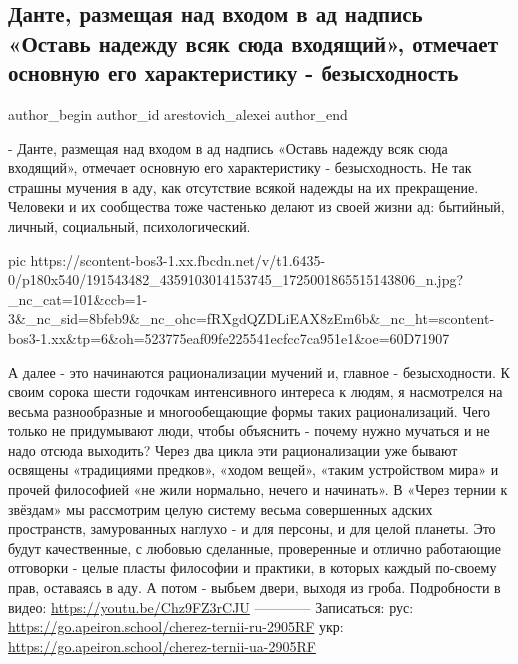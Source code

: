  
 
 
 
 
 
\subsection{Данте, размещая над входом в ад надпись «Оставь надежду всяк сюда входящий», отмечает основную его характеристику - безысходность}
\label{sec:25_05_2021.fb.arestovich_alexei.1.ad_dante}
\ifcmt
 author_begin
   author_id arestovich_alexei
 author_end
\fi

- Данте, размещая над входом в ад надпись «Оставь надежду всяк сюда входящий», отмечает основную его характеристику - безысходность.
Не так страшны мучения в аду, как отсутствие всякой надежды на их прекращение.
Человеки и их сообщества тоже частенько делают из своей жизни ад: бытийный, личный, социальный, психологический.

\ifcmt
  pic https://scontent-bos3-1.xx.fbcdn.net/v/t1.6435-0/p180x540/191543482_4359103014153745_1725001865515143806_n.jpg?_nc_cat=101&ccb=1-3&_nc_sid=8bfeb9&_nc_ohc=fRXgdQZDLiEAX8zEm6b&_nc_ht=scontent-bos3-1.xx&tp=6&oh=523775eaf09fe225541ecfcc7ca951e1&oe=60D71907
\fi

А далее - это начинаются рационализации мучений и, главное - безысходности.
К своим сорока шести годочкам интенсивного интереса к людям, я насмотрелся на весьма разнообразные и многообещающие формы таких рационализаций. 
Чего только не придумывают люди, чтобы объяснить - почему нужно мучаться и не надо отсюда выходить?
Через два цикла эти рационализации уже бывают освящены «традициями предков», «ходом вещей», «таким устройством мира» и прочей философией «не жили нормально, нечего и начинать».
В «Через тернии к звёздам» мы рассмотрим целую систему весьма совершенных адских пространств, замурованных наглухо - и для персоны, и для целой планеты.
Это будут качественные, с любовью сделанные, проверенные и отлично работающие отговорки - целые пласты философии и практики, в которых каждый по-своему прав, оставаясь в аду. 
А потом - выбьем двери, выходя из гроба.
Подробности в видео:
\url{https://youtu.be/Chz9FZ3rCJU}
————
Записаться: 
рус:
\url{https://go.apeiron.school/cherez-ternii-ru-2905RF}
укр:
\url{https://go.apeiron.school/cherez-ternii-ua-2905RF}
